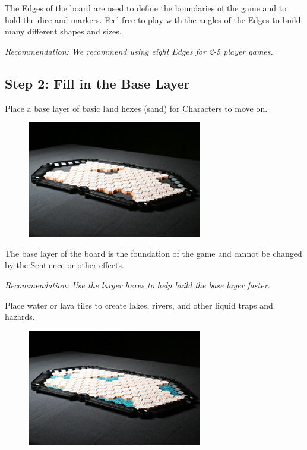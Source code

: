 \documentclass[../main.tex]{subfiles}
\begin{document}
The Edges of the board are used to define the boundaries of the game and to hold the dice and markers. Feel free to play with the angles of the Edges to build many different shapes and sizes.

\textit{Recommendation: We recommend using eight Edges for 2-5 player games.}

\subsection{Step 2: Fill in the Base Layer}
Place a base layer of basic land hexes (sand) for Characters to move on.

\begin{figure}[h]
    \tsgap
    \centering
    \includegraphics[width=1\linewidth]{baselayer.png}
\end{figure}

The base layer of the board is the foundation of the game and cannot be changed by the Sentience or other effects.

\textit{Recommendation: Use the larger hexes to help build the base layer faster.}

Place water or lava tiles to create lakes, rivers, and other liquid traps and hazards. 

\begin{figure}[h]
    \tsgap
    \centering
    \includegraphics[width=1\linewidth]{chapters//boardsetup/watersetup.png}
\end{figure}
\end{document}
